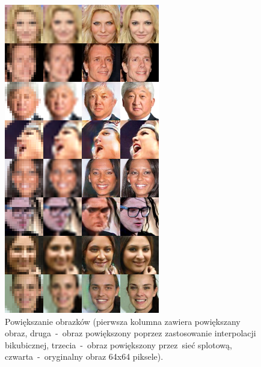 \documentclass[oneside, 11pt, a4paper]{article}
\begin{document}
\begin{multicols}{2}
\begin{figure}[H]
	\centering
	\includegraphics[width=0.9\linewidth, keepaspectratio]{img/srez_sample_output.png}
	\vspace{-2mm}
	\caption{Powiększanie obrazków (pierwsza kolumna zawiera powiększany obraz, druga~-~obraz powiększony poprzez zastosowanie interpolacji bikubicznej, trzecia~-~obraz powiększony przez~sieć splotową, czwarta~-~oryginalny obraz 64x64 piksele).}
	\label{fig:superresolution}

\end{figure}
\end{multicols}
\end{document}
